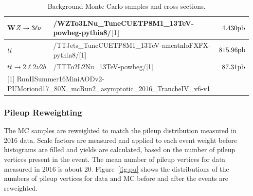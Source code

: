 \begin{table}
\begin{footnotesize}
\begin{tabular}{|l|l|r|}
 W$Z \to 3\ell\nu$ & /WZTo3LNu\_TuneCUETP8M1\_13TeV-powheg-pythia8/[1] & $4.430 \rm{ pb}$ \\ \hline
 $t\bar{t}$ & /TTJets\_TuneCUETP8M1\_13TeV-amcatnloFXFX-pythia8/[1] & $815.96 \rm{ pb}$ \\ 
 $t\bar{t} \to 2\ell2\nu 2b$ & /TTTo2L2Nu\_13TeV-powheg/[1] &  $87.31 \rm{pb}$ \\ \hline
 \multicolumn{3}{l}{[1] RunIISummer16MiniAODv2-PUMoriond17\_80X\_mcRun2\_asymptotic\_2016\_TrancheIV\_v6-v1} \\
 \end{tabular}
 \caption{Background Monte Carlo samples and cross sections.}
  \label{tab:MCsamples}
\end{footnotesize}
\end{table}

\subsubsection{Pileup Reweighting}

The MC samples are reweighted to match the pileup distribution measured in 2016 data. Scale factors are measured and applied to each event weight before histograms are filled and yields are calculated, based on the number of pileup vertices present in the event. The mean number of pileup vertices for data measured in 2016 is about 20. Figure~\ref{fig:pu} shows the distributions of the numbers of pileup vertices for data and MC before and after the events are reweighted.

